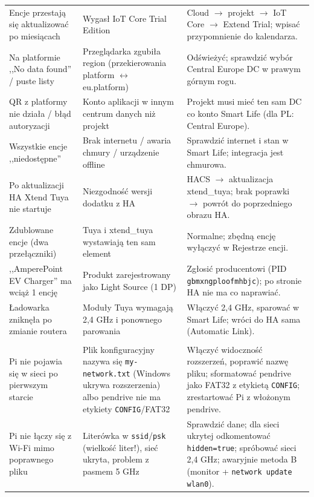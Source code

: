 \documentclass[11pt,a4paper]{article}
\begin{document}
\begin{longtable}{>{\raggedright\arraybackslash}p{4.2cm} >{\raggedright\arraybackslash}p{4.6cm} >{\raggedright\arraybackslash}p{5.6cm}}
\addlinespace
Encje przestają się aktualizować po miesiącach & Wygasł IoT Core Trial Edition & Cloud $\to$ projekt $\to$ IoT Core $\to$ Extend Trial; wpisać przypomnienie do kalendarza.\\
\addlinespace
Na platformie ,,No data found'' / puste listy & Przeglądarka zgubiła region (przekierowania platform $\leftrightarrow$ eu.platform) & Odświeżyć; sprawdzić wybór Central Europe DC w prawym górnym rogu.\\
\addlinespace
QR z platformy nie działa / błąd autoryzacji & Konto aplikacji w innym centrum danych niż projekt & Projekt musi mieć ten sam DC co konto Smart Life (dla PL: Central Europe).\\
\addlinespace
Wszystkie encje ,,niedostępne'' & Brak internetu / awaria chmury / urządzenie offline & Sprawdzić internet i stan w Smart Life; integracja jest chmurowa.\\
\addlinespace
Po aktualizacji HA Xtend Tuya nie startuje & Niezgodność wersji dodatku z HA & HACS $\to$ aktualizacja xtend\_tuya; brak poprawki $\to$ powrót do poprzedniego obrazu HA.\\
\addlinespace
Zdublowane encje (dwa przełączniki) & Tuya i xtend\_tuya wystawiają ten sam element & Normalne; zbędną encję wyłączyć w Rejestrze encji.\\
\addlinespace
,,AmperePoint EV Charger'' ma wciąż 1 encję & Produkt zarejestrowany jako Light Source (1 DP) & Zgłosić producentowi (PID \texttt{gbmxngploofmhbjc}); po stronie HA nie ma co naprawiać.\\
\addlinespace
Ładowarka zniknęła po zmianie routera & Moduły Tuya wymagają 2,4 GHz i ponownego parowania & Włączyć 2,4 GHz, sparować w Smart Life; wróci do HA sama (Automatic Link).\\
\addlinespace
\multicolumn{3}{l}{\textit{--- Raspberry Pi / Wi-Fi (wariant R) ---}}\\
\addlinespace
Pi nie pojawia się w sieci po pierwszym starcie & Plik konfiguracyjny nazywa się \texttt{my-network.txt} (Windows ukrywa rozszerzenia) albo pendrive nie ma etykiety \texttt{CONFIG}/FAT32 & Włączyć widoczność rozszerzeń, poprawić nazwę pliku; sformatować pendrive jako FAT32 z etykietą \texttt{CONFIG}; zrestartować Pi z włożonym pendrive.\\
\addlinespace
Pi nie łączy się z Wi-Fi mimo poprawnego pliku & Literówka w \texttt{ssid}/\texttt{psk} (wielkość liter!), sieć ukryta, problem z pasmem 5 GHz & Sprawdzić dane; dla sieci ukrytej odkomentować \texttt{hidden=true}; spróbować sieci 2,4 GHz; awaryjnie metoda B (monitor + \texttt{network update wlan0}).\\

\end{longtable}
\end{document}
